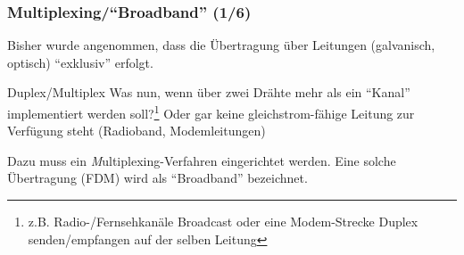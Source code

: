 \documentclass[ignorenonframetext]{beamer}
\begin{document}
\begin{frame}
\frametitle{Multiplexing/``Broadband'' (1/6)}
Bisher wurde angenommen, dass die \"Ubertragung \"uber Leitungen (galvanisch, optisch) ``exklusiv'' erfolgt.
\begin{block}{Duplex/Multiplex}
Was nun, wenn \"uber zwei Dr\"ahte mehr als ein ``Kanal'' implementiert werden soll?\footnote{z.B. Radio-/Fernsehkan\"ale Broadcast oder eine Modem-Strecke Duplex senden/empfangen auf der selben Leitung} Oder gar keine gleichstrom-f\"ahige Leitung zur Verf\"ugung steht (Radioband, Modemleitungen)
\end{block}

Dazu muss ein {\emph Multiplexing}-Verfahren eingerichtet werden. Eine solche \"Ubertragung (FDM) wird als ``Broadband'' bezeichnet.
\end{frame}
\end{document}
